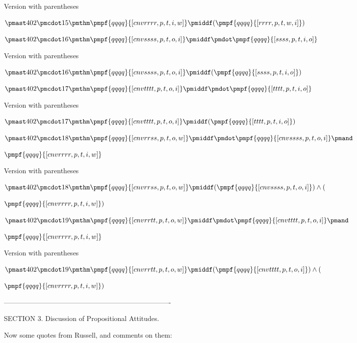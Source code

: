 \documentclass[12pt]{article}
\begin{document}
 

Version with parentheses

$\pmast 402 \pmcdot 15 \pmthm \pmpf{qqqq}{[cnvrrrr, p, t, i, w]} \pmiddf  (  \pmpf{qqqq}{[rrrr, p, t, w, i]} )$


$\pmast 402 \pmcdot 16 \pmthm \pmpf{qqqq}{[cnvssss, p, t, o, i]} \pmiddf \pmdot \pmpf{qqqq}{[ssss, p, t, i, o]} $
 
 

Version with parentheses

$\pmast 402 \pmcdot 16 \pmthm \pmpf{qqqq}{[cnvssss, p, t, o, i]} \pmiddf  (  \pmpf{qqqq}{[ssss, p, t, i, o]} )$


$\pmast 402 \pmcdot 17 \pmthm \pmpf{qqqq}{[cnvtttt, p, t, o, i]} \pmiddf \pmdot \pmpf{qqqq}{[tttt, p, t, i, o]} $
 
 

Version with parentheses

$\pmast 402 \pmcdot 17 \pmthm \pmpf{qqqq}{[cnvtttt, p, t, o, i]} \pmiddf  (  \pmpf{qqqq}{[tttt, p, t, i, o]} )$


$\pmast 402 \pmcdot 18 \pmthm \pmpf{qqqq}{[cnvrrss, p, t, o, w]} \pmiddf \pmdot \pmpf{qqqq}{[cnvssss, p, t, o, i]} \pmand $

$\pmpf{qqqq}{[cnvrrrr, p, t, i, w]} $
 
 

Version with parentheses

$\pmast 402 \pmcdot 18 \pmthm \pmpf{qqqq}{[cnvrrss, p, t, o, w]} \pmiddf  (  \pmpf{qqqq}{[cnvssss, p, t, o, i]} ) \land ( $

$\pmpf{qqqq}{[cnvrrrr, p, t, i, w]} )$


$\pmast 402 \pmcdot 19 \pmthm \pmpf{qqqq}{[cnvrrtt, p, t, o, w]} \pmiddf \pmdot \pmpf{qqqq}{[cnvtttt, p, t, o, i]} \pmand $

$\pmpf{qqqq}{[cnvrrrr, p, t, i, w]} $
 
 

Version with parentheses

$\pmast 402 \pmcdot 19 \pmthm \pmpf{qqqq}{[cnvrrtt, p, t, o, w]} \pmiddf  (  \pmpf{qqqq}{[cnvtttt, p, t, o, i]} ) \land ( $

$\pmpf{qqqq}{[cnvrrrr, p, t, i, w]} )$


-------------------------------------------------------------------------

SECTION 3. Discussion of Propositional Attitudes.

Now some quotes from Russell, and comments on them:
\end{document}
